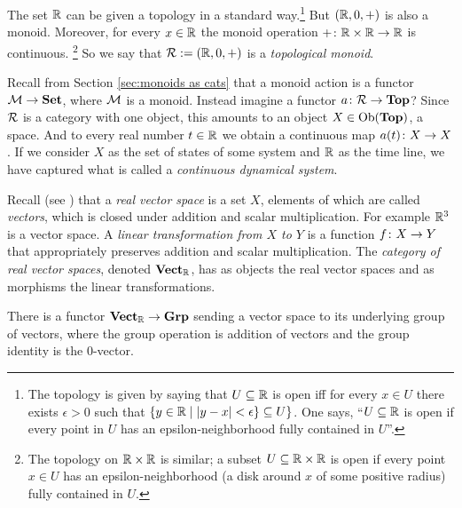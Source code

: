 \begin{example}\label{ex:continuous dynamical systems}

The set ${\mathbb R}$ can be given a topology in a standard way.\footnote{The topology is given by saying that $U\subseteq{\mathbb R}$ is open iff for every $x\in U$ there exists $\epsilon>0$ such that $\{y\in {\mathbb R}{\;|\;} |y-x|<\epsilon\}\subseteq U\}$. One says, “$U\subseteq{\mathbb R}$ is open if every point in $U$ has an epsilon-neighborhood fully contained in $U$”.} But $({\mathbb R},0,+)$ is also a monoid. Moreover, for every $x\in{\mathbb R}$ the monoid operation $+\colon{\mathbb R}\times{\mathbb R}\rightarrow{\mathbb R}$ is continuous.
\footnote{The topology on ${\mathbb R}\times{\mathbb R}$ is similar; a subset $U\subseteq{\mathbb R}\times{\mathbb R}$ is open if every point $x\in U$ has an epsilon-neighborhood (a disk around $x$ of some positive radius) fully contained in $U$.}
So we say that $\mathcal{R}:=({\mathbb R},0,+)$ is a {\em topological monoid}.

Recall from Section \ref{sec:monoids as cats} that a monoid action is a functor $\mathcal{M}\rightarrow{\bf Set}$, where $\mathcal{M}$ is a monoid. Instead imagine a functor $a\colon\mathcal{R}\rightarrow{\bf Top}$? Since $\mathcal{R}$ is a category with one object, this amounts to an object $X\in\textnormal{Ob}({\bf Top})$, a space. And to every real number $t\in{\mathbb R}$ we obtain a continuous map $a(t)\colon X\rightarrow X$. If we consider $X$ as the set of states of some system and ${\mathbb R}$ as the time line, we have captured what is called a {\em continuous dynamical system}.

\end{example}

\begin{example}

Recall (see \cite{Axl}) that a {\em real vector space} is a set $X$, elements of which are called {\em vectors}, which is closed under addition and scalar multiplication. For example ${\mathbb R}^3$ is a vector space. A {\em linear transformation from $X$ to $Y$} is a function $f\colon X\rightarrow Y$ that appropriately preserves addition and scalar multiplication. The {\em category of real vector spaces}, denoted ${\bf Vect}_{\mathbb R}$, has as objects the real vector spaces and as morphisms the linear transformations.

There is a functor ${\bf Vect}_{\mathbb R}\rightarrow{\bf Grp}$ sending a vector space to its underlying group of vectors, where the group operation is addition of vectors and the group identity is the 0-vector. 

\end{example}

